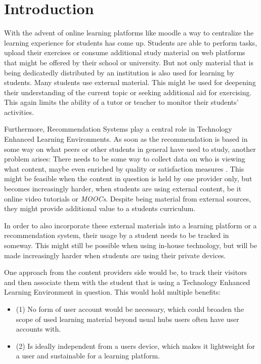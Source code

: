 \section{Introduction} %
\label{sec:introduction}

With the advent of online learning platforms like moodle a way to centralize the learning experience for students has come up. Students are able to perform tasks, upload their exercises or consume additional study material on web platforms that might be offered by their school or university. 
But not only material that is being dedicatedly distributed by an institution is also used for learning by students. Many students use external material. This might be used for deepening their understanding of the current topic or seeking additional aid for exercising. This again limits the ability of a tutor or teacher to monitor their students' activities.

Furthermore, Recommendation Systems play a central role in Technology Enhanced Learning Environments. As soon as the recommendation is based in some way on what peers or other students in general have used to study, another problem arises: 
There needs to be some way to collect data on who is viewing what content, maybe even enriched by quality or satisfaction measures \cite{ricci_panorama_2015}. This might be feasible when the content in question is held by one provider only, but becomes increasingly harder, when students are using external content, be it online video tutorials or \textit{MOOCs}. Despite being material from external sources, they might provide additional value to a students curriculum. 

In order to also incorporate these external materials into a learning platform or a recommendation system, their usage by a student needs to be tracked in someway. This might still be possible when using in-house technology, but will be made increasingly harder when students are using their private devices. 

One approach from the content providers side would be, to track their visitors and then associate them with the student that is using a Technology Enhanced Learning Environment in question. This would hold multiple benefits: \begin{itemize}
\item (1) No form of user account would be necessary, which could broaden the scope of used learning material beyond usual hubs users often have user accounts with.
\item (2) Is ideally independent from a users device, \cite{yen_host_2012,cao_cross-browser_2017,acar_web_2014} which makes it lightweight for a user and sustainable for a learning platform. 
\end{itemize}

